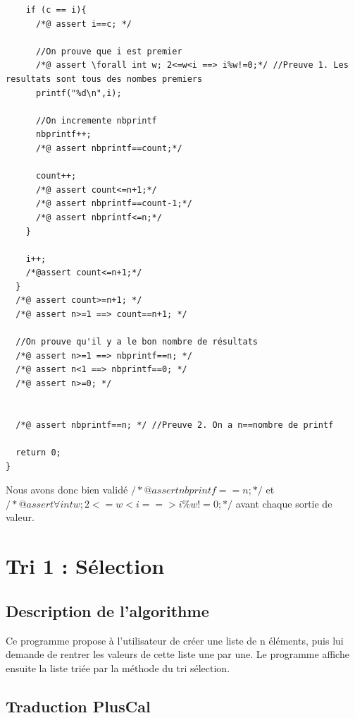 \documentclass{scrreprt}
\begin{document}
\begin{lstlisting}
    if (c == i){
      /*@ assert i==c; */

      //On prouve que i est premier
      /*@ assert \forall int w; 2<=w<i ==> i%w!=0;*/ //Preuve 1. Les resultats sont tous des nombes premiers
      printf("%d\n",i);

	  //On incremente nbprintf
	  nbprintf++;
      /*@ assert nbprintf==count;*/

      count++;
      /*@ assert count<=n+1;*/
      /*@ assert nbprintf==count-1;*/
      /*@ assert nbprintf<=n;*/
    }

    i++;
    /*@assert count<=n+1;*/
  }
  /*@ assert count>=n+1; */
  /*@ assert n>=1 ==> count==n+1; */

  //On prouve qu'il y a le bon nombre de résultats
  /*@ assert n>=1 ==> nbprintf==n; */
  /*@ assert n<1 ==> nbprintf==0; */
  /*@ assert n>=0; */


  /*@ assert nbprintf==n; */ //Preuve 2. On a n==nombre de printf

  return 0;
}
\end{lstlisting}

Nous avons donc bien validé $/*@ assert nbprintf==n; */$ et $/*@ assert \forall int w; 2<=w<i ==> i\%w!=0;*/$ avant chaque sortie de valeur.

%
%
%

\chapter{Tri 1 : Sélection}

\section{Description de l'algorithme}
Ce programme propose à l'utilisateur de créer une liste de n éléments, puis lui demande de rentrer les valeurs de cette liste une par une. Le programme affiche ensuite la liste triée par la méthode du tri sélection.

\section{Traduction PlusCal}
\end{document}
